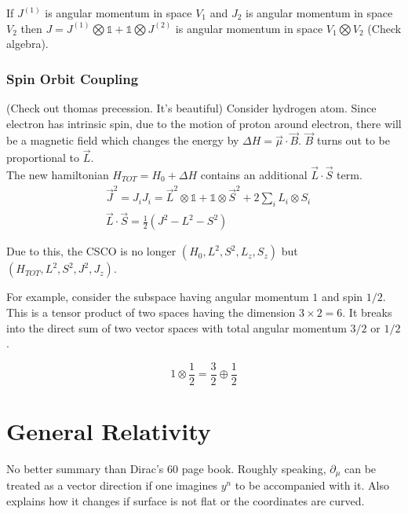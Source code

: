 \documentclass{report}
\begin{document}
If $J^{(1)}$ is angular momentum in space $V_1$ and $J_2$ is angular momentum in space $V_2$ then $J = J^{(1)}\bigotimes\mathbb{1} + \mathbb{1}\bigotimes J^{(2)}$ is angular momentum in space $V_1\bigotimes V_2$ (Check algebra).

\subsection{Spin Orbit Coupling}

(Check out thomas precession. It's beautiful) Consider hydrogen atom. Since electron has intrinsic spin, due to the motion of proton around electron, there will be a magnetic field which changes the energy by $\Delta H = \vec{\mu}\cdot \vec{B}$. $\vec{B}$ turns out to be proportional to $\vec{L}$.\\

\noindent The new hamiltonian $H_{TOT} = H_0 + \Delta H$ contains an additional $\vec{L}\cdot\vec{S}$ term.\\

\begin{align}
&\vec{J}^2 = J_iJ_i = \vec{L}^2\otimes\mathbb{1} + \mathbb{1}\otimes \vec{S}^2 + 2 \sum_{i}L_i\otimes S_i\nonumber\\
&\vec{L}\cdot\vec{S} = \frac{1}{2}(J^2 - L^2 - S^2)
\end{align}

\noindent Due to this, the CSCO is no longer $(H_0,L^2,S^2, L_z, S_z)$ but $(H_{TOT},L^2, S^2,J^2,J_z)$.

\noindent For example, consider the subspace having angular momentum $1$ and spin $1/2$. This is a tensor product of two spaces having the dimension $3\times2=6$. It breaks into the direct sum of two vector spaces with total angular momentum $3/2$ or $1/2$.

$$1\otimes\frac{1}{2} = \frac{3}{2} \oplus \frac{1}{2}$$

\chapter{General Relativity}
No better summary than Dirac's 60 page book. Roughly speaking, $\partial_\mu$ can be treated as a vector direction if one imagines $y^n$ to be accompanied with it. Also explains how it changes if surface is not flat or the coordinates are curved.
\end{document}
